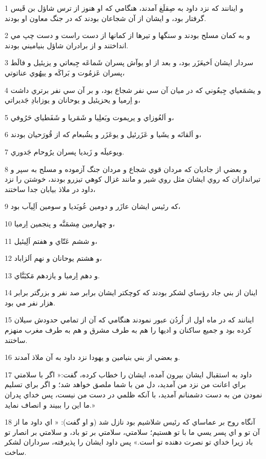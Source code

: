 \par 1 و اينانند که نزد داود به صِقلَغ آمدند، هنگامي که او هنوز از ترس شاؤل بن قَيس گرفتار بود، و ايشان از آن شجاعان بودند که در جنگ معاون او بودند.
\par 2 و به کمان مسلح بودند و سنگها و تيرها از کمانها از دست راست و دست چپ مي انداختند و از برادران شاؤل بنياميني بودند.
\par 3 سردار ايشان اَخيعَزَر بود، و بعد از او يوآش پسران شَماعَه جِبعاتي و يزيئيل و فالَط پسران عَزمُوت و بَراکَه و ييهُوي عناتوتي،
\par 4 و يشمَعياي جِبعُوني که در ميان آن سي نفر شجاع بود، و بر آن سي نفر برتري داشت و اِرميا و يحزيئيل و يوحانان و يوزابادِ جَديراتي،
\par 5 و اَلعُوزاي و يريموت وبَعلِيا و شَمَريا و شَفَطياي حَرُوفي،
\par 6 و اَلقانَه و يشَيا و عَزَرئيل و يوعَزَر و يشُبعام که از قُورَحيان بودند،
\par 7 ويوعيلَه و زَبديا پسران يرُوحام جَدوري.
\par 8 و بعضي از جاديان که مردان قوي شجاع و مردان جنگ آزموده و مسلح به سپر و تيراندازان که روي ايشان مثل روي شير و مانند غزال کوهي تيزرو بودند، خوشتن را نزد داود در ملاذ بيابان جدا ساختند،
\par 9 که رئيس ايشان عازَر و دومين عُوبَديا و سومين اَلِيآب بود،
\par 10 و چهارمين مِشمَنَّه و پنجمين اِرميا،
\par 11 و ششم عَتّاي و هفتم اَلِيئيل،
\par 12 و هشتم يوحانان و نهم اَلزاباد،
\par 13 و دهم اِرميا و يازدهم مَکبَنَّاي.
\par 14 اينان از بني جاد رؤساي لشکر بودند که کوچکتر ايشان برابر صد نفر و بزرگتر برابر هزار نفر مي بود.
\par 15 اينانند که در ماه اول از اُردُن عبور نمودند هنگامي که آن از تمامي حدودش سيلان کرده بود و جميع ساکنان و اديها را هم به طرف مشرق و هم به طرف مغرب منهزم ساختند.
\par 16 و بعضي از بني بنيامين و يهودا نزد داود به آن ملاذ آمدند.
\par 17 داود به استقبال ايشان بيرون آمده، ايشان را خطاب کرده، گفت:« اگر با سلامتي براي اعانت من نزد من آمديد، دل من با شما ملصق خواهد شد؛ و اگر براي تسليم نمودن من به دست دشمنانم آمديد، با آنکه ظلمي در دست من نيست، پس خداي پدران ما اين را ببيند و انصاف نمايد.»
\par 18 آنگاه روح بر عماساي که رئيس شلاشيم بود نازل شد (و او گفت): « اي داود ما از آن تو و اي پسر يسي ما با تو هستيم؛ سلامتي، سلامتي بر تو باد، و سلامتي بر انصار تو باد زيرا خداي تو نصرت دهنده تو است.» پس داود ايشان را پذيرفته، سرداران لشکر ساخت.
